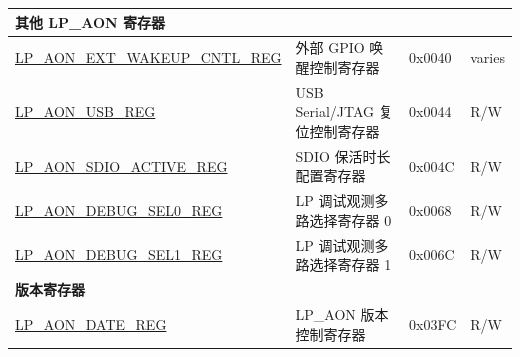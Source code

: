 \begin{longtable}{ | p{6cm} | p{7.2cm} | p{1.3cm} | p{1cm} | }
\multicolumn{4}{|l|}{\textbf{其他 LP\_AON 寄存器}} \\ \hline
\hyperref[regdesc:LPAONEXTWAKEUPCNTLREG]{LP\_AON\_EXT\_WAKEUP\_CNTL\_REG} & 外部 GPIO 唤醒控制寄存器 & 0x0040 & varies \\ \hline
\hyperref[regdesc:LPAONUSBREG]{LP\_AON\_USB\_REG} & USB Serial/JTAG 复位控制寄存器 & 0x0044 & R/W \\ \hline
\hyperref[regdesc:LPAONSDIOACTIVEREG]{LP\_AON\_SDIO\_ACTIVE\_REG} & SDIO 保活时长配置寄存器 & 0x004C & R/W \\ \hline
\hyperref[regdesc:LPAONDEBUGSEL0REG]{LP\_AON\_DEBUG\_SEL0\_REG} & LP 调试观测多路选择寄存器 0 & 0x0068 & R/W \\ \hline
\hyperref[regdesc:LPAONDEBUGSEL1REG]{LP\_AON\_DEBUG\_SEL1\_REG} & LP 调试观测多路选择寄存器 1 & 0x006C & R/W \\ \hline
\multicolumn{4}{|l|}{\textbf{版本寄存器}} \\ \hline
\hyperref[regdesc:LPAONDATEREG]{LP\_AON\_DATE\_REG} & LP\_AON 版本控制寄存器 & 0x03FC & R/W \\ \hline
\end{longtable}
